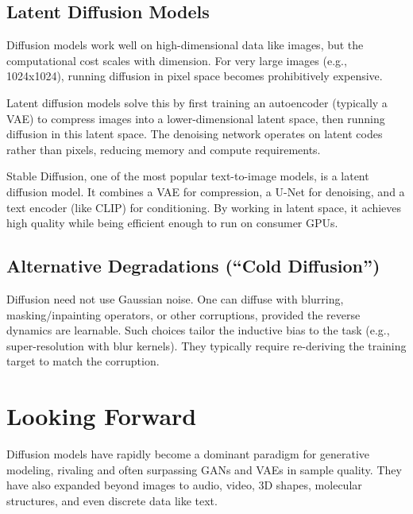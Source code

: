 \vspSection

\subsection{Latent Diffusion Models}

Diffusion models work well on high-dimensional data like images, but the computational cost scales with dimension. For very large images (e.g., 1024x1024), running diffusion in pixel space becomes prohibitively expensive.

\vspPara

Latent diffusion models solve this by first training an autoencoder (typically a VAE) to compress images into a lower-dimensional latent space, then running diffusion in this latent space. The denoising network operates on latent codes rather than pixels, reducing memory and compute requirements.

\vspPara

Stable Diffusion, one of the most popular text-to-image models, is a latent diffusion model. It combines a VAE for compression, a U-Net for denoising, and a text encoder (like CLIP) for conditioning. By working in latent space, it achieves high quality while being efficient enough to run on consumer GPUs.

\vspChapter


\vspLarge
\subsection{Alternative Degradations (``Cold Diffusion'')}
Diffusion need not use Gaussian noise. One can diffuse with blurring, masking/inpainting operators, or other corruptions, provided the reverse dynamics are learnable. Such choices tailor the inductive bias to the task (e.g., super-resolution with blur kernels). They typically require re-deriving the training target to match the corruption.

\vspChapter

\section{Looking Forward}
\label{sec:looking_forward}

\vspBlock

Diffusion models have rapidly become a dominant paradigm for generative modeling, rivaling and often surpassing GANs and VAEs in sample quality. They have also expanded beyond images to audio, video, 3D shapes, molecular structures, and even discrete data like text.


